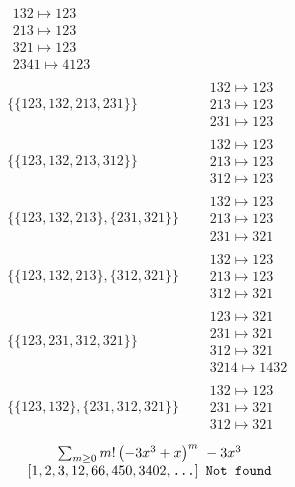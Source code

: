 \begin{tiny}
\begin{align}
\begin{matrix}
132 \mapsto 123\\213 \mapsto 123\\321 \mapsto 123\\2341 \mapsto 4123
\end{matrix}
\\
\{\{123, 132, 213, 231\}\}
\quad
&
\begin{matrix}
132 \mapsto 123\\213 \mapsto 123\\231 \mapsto 123
\end{matrix}
\\
\{\{123, 132, 213, 312\}\}
\quad
&
\begin{matrix}
132 \mapsto 123\\213 \mapsto 123\\312 \mapsto 123
\end{matrix}
\\
\{\{123, 132, 213\}, \{231, 321\}\}
\quad
&
\begin{matrix}
132 \mapsto 123\\213 \mapsto 123\\231 \mapsto 321
\end{matrix}
\\
\{\{123, 132, 213\}, \{312, 321\}\}
\quad
&
\begin{matrix}
132 \mapsto 123\\213 \mapsto 123\\312 \mapsto 321
\end{matrix}
\\
\{\{123, 231, 312, 321\}\}
\quad
&
\begin{matrix}
123 \mapsto 321\\231 \mapsto 321\\312 \mapsto 321\\3214 \mapsto 1432
\end{matrix}
\\
\{\{123, 132\}, \{231, 312, 321\}\}
\quad
&
\begin{matrix}
132 \mapsto 123\\231 \mapsto 321\\312 \mapsto 321
\end{matrix}
\end{align}
$$
\begin{matrix}
\sum_{m \geq 0} m! \left(
-3 x^{3} + x
\right)^m
\ 
-3 x^{3}
\\
\left[1, 2, 3, 12, 66, 450, 3402, \text{\texttt{...}}\right]
\ 
\texttt{Not found}
\end{matrix}
$$
\vspace{-1em}

\end{tiny}

